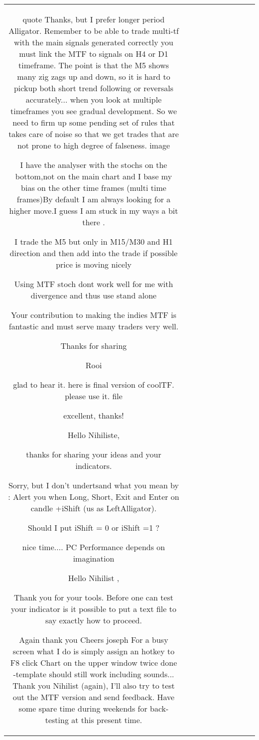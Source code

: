 \begin{table}[h!]
\begin{tabular}{|c|c|c|c|c|c|c|c|c|c|}
{quote} Thanks, but I prefer longer period Alligator. Remember to be able to trade multi-tf with the main signals generated correctly you must link the MTF to signals on H4 or D1 timeframe. The point is that the M5 shows many zig zags up and down, so it is hard to pickup both short trend following or reversals accurately... when you look at multiple timeframes you see gradual development. So we need to firm up some pending set of rules that takes care of noise so that we get trades that are not prone to high degree of falseness. {image}

I have the analyser with the stochs on the bottom,not on the main chart and I base my bias on the other time frames (multi time frames)By default I am always looking for a higher move.I guess I am stuck in my ways a bit there  .

I trade the M5 but only in M15/M30 and H1 direction and then add into the trade if possible price is moving nicely

Using MTF stoch dont work well for me with divergence and thus use stand alone

Your contribution to making the indies MTF is fantastic and must serve many traders very well.

Thanks for sharing

Rooi


glad to hear it. here is final version of coolTF. please use it. {file}

excellent, thanks!

Hello Nihiliste,

thanks for sharing your ideas and your indicators.

Sorry, but I don't undertsand what you mean by : Alert you when Long, Short, Exit and Enter on candle +iShift (us as LeftAlligator).

Should I put iShift = 0 or iShift =1 ?

nice time....
PC
Performance depends on imagination

Hello Nihilist ,

Thank you for your tools. Before one can test your indicator is it possible to put a text file to say exactly how to proceed.

Again thank you Cheers joseph
For a busy screen what I do is simply assign an hotkey to F8 click Chart on the upper window twice done -template should still work including sounds...
Thank you Nihilist (again), I'll also try to test out the MTF version and send feedback. Have some spare time during weekends for back-testing at this present time.


\end{tabular}
\end{table}
